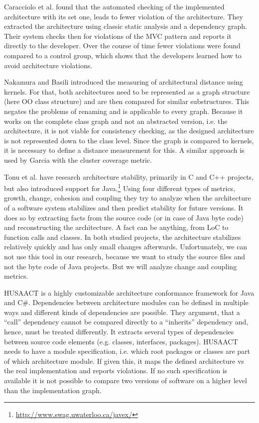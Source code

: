 \documentclass[conference]{IEEEtran}
\begin{document}
Caracciolo et al. \cite{ArcConf} found that the automated checking of the implemented architecture with its set one, leads to fewer violation of the architecture. They extracted the architecture using classic static analysis and a dependency graph. Their system checks then for violations of the MVC pattern and reports it directly to the developer. Over the course of time fewer violations were found compared to a control group, which shows that the developers learned how to avoid architecture violations.

Nakamura and Basili \cite{StructDist} introduced the measuring of architectural distance using kernels. For that, both architectures need to be represented as a graph structure (here OO class structure) and are then compared for similar substructures. This negates the problems of renaming and is applicable to every graph. 
Because it works on the complete class graph and not an abstracted version, i.e. the architecture, it is not viable for consistency checking, as the designed architecture is not represented down to the class level. 
Since the graph is compared to kernels, it is necessary to define a distance measurement for this. A similar approach is used by Garcia \cite{arcade-thesis} with the cluster coverage metric.

Tonu et al. \cite{Swag} have research architecture stability, primarily in C and C++ projects, but also introduced support for Java.\footnote{\url{http://www.swag.uwaterloo.ca/javex/}} Using four different types of metrics, growth, change, cohesion and coupling they try to analyze when the architecture of a software system stabilizes and then predict stability for future versions. It does so by extracting facts from the source code (or in case of Java byte code) and reconstructing the architecture. A fact can be anything, from LoC to function calls and classes. 
In both studied projects, the architecture stabilizes relatively quickly and has only small changes afterwards. Unfortunately, we can not use this tool in our research, because we want to study the source files and not the byte code of Java projects. But we will analyze change and coupling metrics.

HUSAACT \cite{Husacct1,Husacct2} is a highly customizable architecture conformance framework for Java and C\#. Dependencies between architecture modules can be defined in multiple ways and different kinds of dependencies are possible. They argument, that a ``call'' dependency cannot be compared directly to a ``inherits'' dependency and, hence, must be treated differently. 
It extracts several types of dependencies between source code elements (e.g. classes, interfaces, packages). HUSAACT needs to have a module specification, i.e. which root packages or classes are part of which architecture module. If given this, it maps the defined architecture vs the real implementation and reports violations.
If no such specification is available it is not possible to compare two versions of software on a higher level than the implementation graph. 
\end{document}
